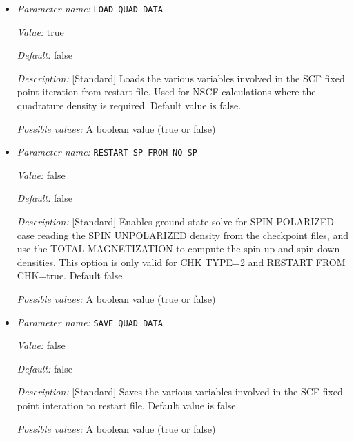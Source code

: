 \begin{itemize}
    \item {\it Parameter name:} {\tt LOAD QUAD DATA}
    \label{parameters:SCF Checkpointing and Restart/LOAD QUAD DATA}
    \label{parameters:SCF_20Checkpointing_20and_20Restart/LOAD_20QUAD_20DATA}
    
    
    {\it Value:} true
    
    
    {\it Default:} false
    
    
    {\it Description:} [Standard] Loads the various variables involved in the SCF fixed point iteration from restart file. Used for NSCF calculations where the quadrature density is required. Default value is false.
    
    
    {\it Possible values:} A boolean value (true or false)
\item {\it Parameter name:} {\tt RESTART SP FROM NO SP}
\label{parameters:SCF Checkpointing and Restart/RESTART SP FROM NO SP}
\label{parameters:SCF_20Checkpointing_20and_20Restart/RESTART_20SP_20FROM_20NO_20SP}


{\it Value:} false


{\it Default:} false


{\it Description:} [Standard] Enables ground-state solve for SPIN POLARIZED case reading the SPIN UNPOLARIZED density from the checkpoint files, and use the TOTAL MAGNETIZATION to compute the spin up and spin down densities. This option is only valid for CHK TYPE=2 and RESTART FROM CHK=true. Default false.


{\it Possible values:} A boolean value (true or false)
\item {\it Parameter name:} {\tt SAVE QUAD DATA}
\label{parameters:SCF Checkpointing and Restart/SAVE QUAD DATA}
\label{parameters:SCF_20Checkpointing_20and_20Restart/SAVE_20QUAD_20DATA}


{\it Value:} false


{\it Default:} false


{\it Description:} [Standard] Saves the various variables involved in the SCF fixed point interation to restart file. Default value is false.


{\it Possible values:} A boolean value (true or false)
\end{itemize}

